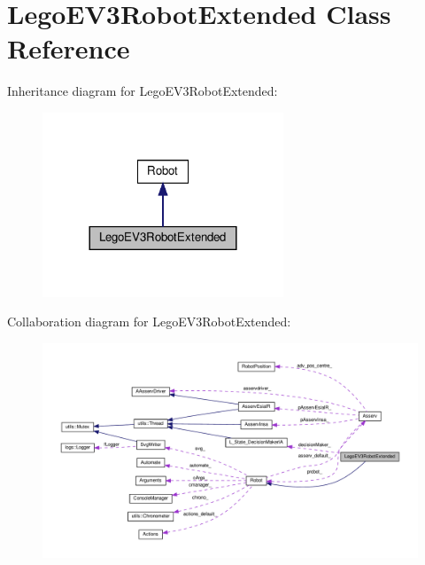 \hypertarget{classLegoEV3RobotExtended}{}\section{Lego\+E\+V3\+Robot\+Extended Class Reference}
\label{classLegoEV3RobotExtended}


Inheritance diagram for Lego\+E\+V3\+Robot\+Extended\+:
\nopagebreak
\begin{figure}[H]
\begin{center}
\leavevmode
\includegraphics[width=204pt]{classLegoEV3RobotExtended__inherit__graph}
\end{center}
\end{figure}


Collaboration diagram for Lego\+E\+V3\+Robot\+Extended\+:
\nopagebreak
\begin{figure}[H]
\begin{center}
\leavevmode
\includegraphics[width=350pt]{classLegoEV3RobotExtended__coll__graph}
\end{center}
\end{figure}
